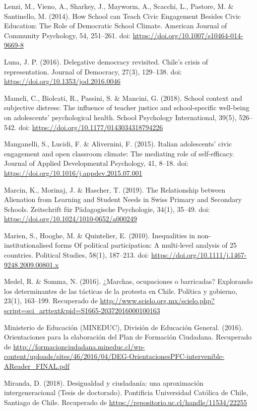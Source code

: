 \documentclass[12pt,twoside]{templates/facsothesis}
\begin{document}
Lenzi, M., Vieno, A., Sharkey, J., Mayworm, A., Scacchi, L., Pastore, M. \& Santinello, M. (2014). How School can Teach Civic Engagement Besides Civic Education: The Role of Democratic School Climate. American Journal of Community Psychology, 54, 251--261. doi: \url{https://doi.org/10.1007/s10464-014-9669-8}

Luna, J. P. (2016). Delegative democracy revisited. Chile's crisis of representation. Journal of Democracy, 27(3), 129--138. doi: \url{https://doi.org/10.1353/jod.2016.0046}

Mameli, C., Biolcati, R., Passini, S. \& Mancini, G. (2018). School context and subjective distress: The influence of teacher justice and school-specific well-being on adolescents' psychological health. School Psychology International, 39(5), 526--542. doi: \url{https://doi.org/10.1177/0143034318794226}

Manganelli, S., Lucidi, F. \& Alivernini, F. (2015). Italian adolescents' civic engagement and open classroom climate: The mediating role of self-efficacy. Journal of Applied Developmental Psychology, 41, 8--18. doi: \url{https://doi.org/10.1016/j.appdev.2015.07.001}

Marcin, K., Morinaj, J. \& Hascher, T. (2019). The Relationship between Alienation from Learning and Student Needs in Swiss Primary and Secondary Schools. Zeitschrift für Pädagogische Psychologie, 34(1), 35--49. doi: \url{https://doi.org/10.1024/1010-0652/a000249}

Marien, S., Hooghe, M. \& Quintelier, E. (2010). Inequalities in non-institutionalised forms Of political participation: A multi-level analysis of 25 countries. Political Studies, 58(1), 187--213. doi: \url{https://doi.org/10.1111/j.1467-9248.2009.00801.x}

Medel, R. \& Somma, N. (2016). ¿Marchas, ocupaciones o barricadas? Explorando los determinantes de las tácticas de la protesta en Chile. Política y gobierno, 23(1), 163--199. Recuperado de \url{http://www.scielo.org.mx/scielo.php?script=sci_arttext\&pid=S1665-20372016000100163}

Ministerio de Educación (MINEDUC), División de Educación General. (2016). Orientaciones para la elaboración del Plan de Formación Ciudadana. Recuperado de \url{http://formacionciudadana.mineduc.cl/wp-content/uploads/sites/46/2016/04/DEG-OrientacionesPFC-intervenible-AReader_FINAL.pdf}

Miranda, D. (2018). Desigualdad y ciudadanía: una aproximación intergeneracional (Tesis de doctorado). Pontificia Universidad Católica de Chile, Santiago de Chile. Recuperado de \url{https://repositorio.uc.cl/handle/11534/22255}
\end{document}
